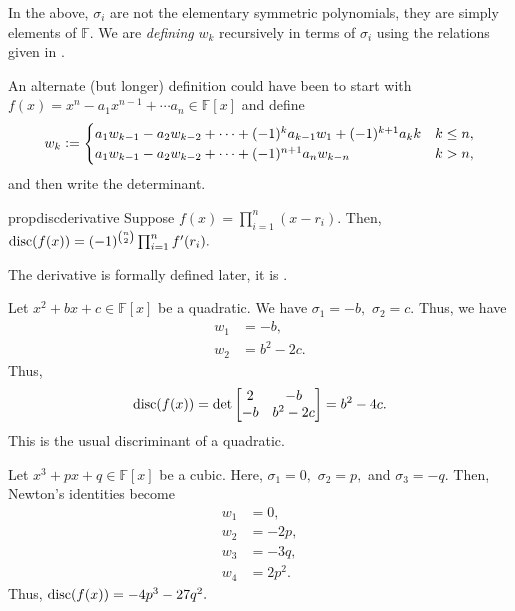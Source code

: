 \begin{rem}
    In the above, $\sigma_i$ are not the elementary symmetric polynomials, they are simply elements of $\mathbb{F}.$ We are \emph{defining} $w_k$ recursively in terms of $\sigma_i$ using the relations given in .

    An alternate (but longer) definition could have been to start with $f(x)  = x^n - a_1x^{n - 1} + \cdots a_n \in \mathbb{F}[x]$ and define 
    \begin{equation*} 
        w_k \vcentcolon= \begin{cases}
            a_1 w_{k - 1} - a_2w_{k - 2} + \cdots + (-1)^k a_{k - 1}w_1 + (-1)^{k + 1}a_k k & k \le n,\\
            a_1 w_{k - 1} - a_2w_{k - 2} + \cdots + (-1)^{n + 1} a_{n}w_{k - n} & k > n,            
        \end{cases}
    \end{equation*}
    and then write the determinant.
\end{rem}

\begin{restatable}{prop}{discderivative}
\label{prop:discderivative}
    Suppose $f(x) = \prod_{i = 1}^{n}(x - r_i).$ Then, $\operatorname{disc}(f(x)) = (-1)^{\binom{n}{2}}\prod_{i = 1}^{n}f'(r_i).$ \hfill\hyperref[prop:discderivative2]{\downsym}
\end{restatable}

The derivative is formally defined later, it is .

\begin{ex}
    Let $x^2 + bx + c \in \mathbb{F}[x]$ be a quadratic. We have $\sigma_1 = -b,$ $\sigma_2 = c.$ Thus, we have
    \begin{align*} 
        w_1 &= -b,\\
        w_2 &= b^2 - 2c.
    \end{align*}
    Thus,
    \begin{equation*} 
        \operatorname{disc}(f(x)) = \det\begin{bmatrix}
            2 & -b\\
            -b & b^2 - 2c
        \end{bmatrix} = b^2 - 4c.
    \end{equation*}
    This is the usual discriminant of a quadratic.
\end{ex}

\begin{ex} \label{ex:disccubic}
    Let $x^3 + px + q \in \mathbb{F}[x]$ be a cubic. Here, $\sigma_1 = 0,$ $\sigma_2 = p,$ and $\sigma_3 = -q.$ Then, Newton's identities become
    \begin{align*} 
        w_1 &= 0,\\
        w_2 &= -2p,\\
        w_3 &= -3q,\\
        w_4 &= 2p^2.
    \end{align*}
    Thus, $\operatorname{disc}(f(x)) = -4p^3 - 27q^2.$
\end{ex}


